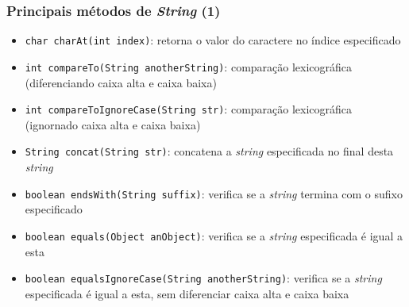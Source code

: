 \documentclass[xcolor={dvipsnames,table},aspectratio=169]{beamer}
\begin{document}
\begin{frame}\frametitle{Principais métodos de \emph{String} (1)}
\begin{itemize}
\item \texttt{char charAt(int index)}: retorna o valor do caractere no índice especificado
\item \texttt{int compareTo(String anotherString)}: comparação lexicográfica (diferenciando caixa alta e caixa baixa)
\item \texttt{int compareToIgnoreCase(String str)}: comparação lexicográfica (ignornado caixa alta e caixa baixa)
\item \texttt{String concat(String str)}: concatena a \emph{string} especificada no final desta \emph{string}
\item \texttt{boolean endsWith(String suffix)}: verifica se a \emph{string} termina com o sufixo especificado
\item \texttt{boolean equals(Object anObject)}: verifica se a \emph{string} especificada é igual a esta
\item \texttt{boolean equalsIgnoreCase(String anotherString)}: verifica se a \emph{string} especificada é igual a esta, sem diferenciar caixa alta e caixa baixa
\end{itemize}
\end{frame}
\end{document}
